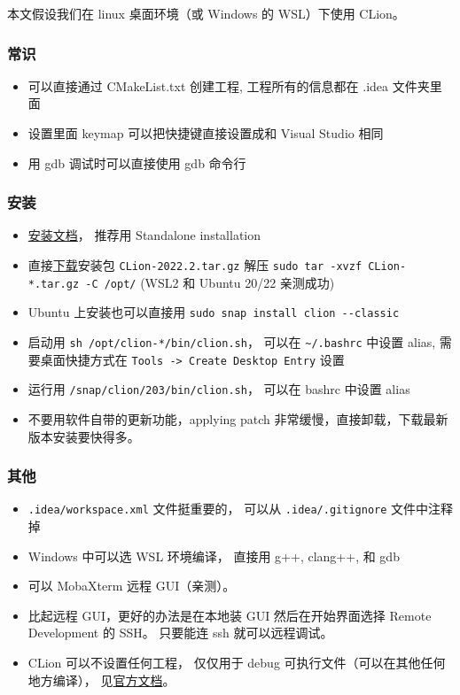 
\begin{issues}
\issueDraft
\end{issues}

本文假设我们在 linux 桌面环境（或 Windows 的 WSL）下使用 CLion。

\subsubsection{常识}
\begin{itemize}
\item 可以直接通过 CMakeList.txt 创建工程, 工程所有的信息都在 .idea 文件夹里面
\item 设置里面 keymap 可以把快捷键直接设置成和 Visual Studio 相同
\item 用 gdb 调试时可以直接使用 gdb 命令行
\end{itemize}

\subsubsection{安装}
\begin{itemize}
\item \href{https://www.jetbrains.com/help/clion/installation-guide.html}{安装文档}， 推荐用 Standalone installation
\item 直接\href{https://www.jetbrains.com/clion/download/#section=linux}{下载}安装包 \verb`CLion-2022.2.tar.gz` 解压 \verb`sudo tar -xvzf CLion-*.tar.gz -C /opt/` (WSL2 和 Ubuntu 20/22 亲测成功)
\item Ubuntu 上安装也可以直接用 \verb`sudo snap install clion --classic`
\item  启动用 \verb`sh /opt/clion-*/bin/clion.sh`， 可以在 \verb|~/.bashrc| 中设置 alias, 需要桌面快捷方式在 \verb`Tools -> Create Desktop Entry` 设置
\item 运行用 \verb`/snap/clion/203/bin/clion.sh`， 可以在 bashrc 中设置 alias
\item 不要用软件自带的更新功能，applying patch 非常缓慢，直接卸载，下载最新版本安装要快得多。
\end{itemize}


\subsubsection{其他}
\begin{itemize}
\item \verb`.idea/workspace.xml` 文件挺重要的， 可以从 \verb`.idea/.gitignore` 文件中注释掉
\item Windows 中可以选 WSL 环境编译， 直接用 g++, clang++, 和 gdb
\item 可以 MobaXterm 远程 GUI（亲测）。
\item 比起远程 GUI，更好的办法是在本地装 GUI 然后在开始界面选择 Remote Development 的 SSH。 只要能连 ssh 就可以远程调试。


\item CLion 可以不设置任何工程， 仅仅用于 debug 可执行文件（可以在其他任何地方编译）， 见\href{https://www.jetbrains.com/help/clion/debug-arbitrary-executable.html}{官方文档}。
\end{itemize}


